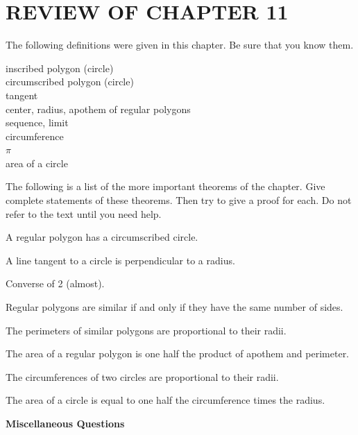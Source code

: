 \documentclass[11pt]{book}
\theoremstyle{XIplainnote}
\theoremstyle{bkplain}
\begin{document}
\section*{REVIEW OF CHAPTER 11}

The following definitions were given in this chapter. Be sure that you know
them.

\begin{center}
\begin{minipage}{0.66\linewidth}
inscribed polygon (circle)\\
circumscribed polygon (circle)\\
tangent\\
center, radius, apothem of regular polygons\\
sequence, limit\\
circumference\\
$\pi$\\
area of a circle
\end{minipage}
\end{center}

The following is a list of the more important theorems of the chapter. Give
complete statements of these theorems. Then try to give a proof for each. Do
not refer to the text until you need help.

\begin{exlist}
\item A regular polygon has a circumscribed circle.
\item A line tangent to a circle is perpendicular to a radius.
\item Converse of 2 (almost).
\item Regular polygons are similar if and only if they have the same number of
      sides.
\item The perimeters of similar polygons are proportional to their radii.
\item The area of a regular polygon is one half the product of apothem and
      perimeter.
\item The circumferences of two circles are proportional to their radii.
\item The area of a circle is equal to one half the circumference times the
      radius.
\end{exlist}

\begin{center}\bfseries Miscellaneous Questions\end{center}
\nopagebreak
\end{document}
